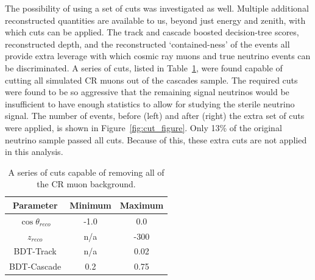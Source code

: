 \documentclass[main.tex]{subfiles}
\begin{document}
The possibility of using a set of cuts was investigated as well. 
Multiple additional reconstructed quantities are available to us, beyond just energy and zenith, with which cuts can be applied. 
The track and cascade boosted decision-tree scores, reconstructed depth, and the reconstructed `contained-ness' of the events all provide extra leverage with which cosmic ray muons and true neutrino events can be discriminated.
A series of cuts, listed in Table~\ref{tab:cut_table}, were found capable of cutting all simulated CR muons out of the cascades sample.
The required cuts were found to be so aggressive that the remaining signal neutrinos would be insufficient to have enough statistics to allow for studying the sterile neutrino signal.
The number of events, before (left) and after (right) the extra set of cuts were applied, is shown in Figure~\ref{fig:cut_figure}.
Only 13\% of the original neutrino sample passed all cuts. 
Because of this, these extra cuts are not applied in this analysis. 

\begin{table}
    \centering
    \begin{tabular}{c|cc}\rowcolor{blue!25}
        Parameter & Minimum & Maximum \\\hline
        $\cos\theta_{reco}$ & -1.0 & 0.0 \\
        $z_{reco}$ & n/a & -300 \\
        BDT-Track & n/a & 0.02 \\
        BDT-Cascade & 0.2 & 0.75
    \end{tabular}
    \caption{A series of cuts capable of removing all of the CR muon background.}\label{tab:cut_table}
\end{table}
\end{document}
